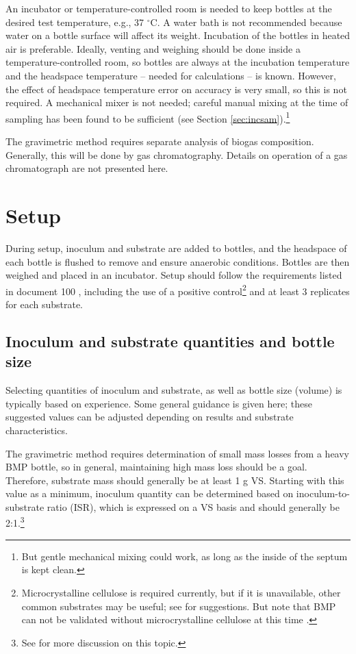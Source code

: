 \documentclass[]{article}
\begin{document}
An incubator or temperature-controlled room is needed to keep bottles at the desired test temperature, e.g., 37 $^\circ$C.
A water bath is not recommended because water on a bottle surface will affect its weight.
Incubation of the bottles in heated air is preferable.
Ideally, venting and weighing should be done inside a temperature-controlled room, so bottles are always at the incubation temperature and the headspace temperature -- needed for calculations -- is known.
However, the effect of headspace temperature error on accuracy is very small, so this is not required.
A mechanical mixer is not needed; careful manual mixing at the time of sampling has been found to be sufficient (see Section \ref{sec:incsam}).\footnote{But gentle mechanical mixing could work, as long as the inside of the septum is kept clean.}

The gravimetric method requires separate analysis of biogas composition.
Generally, this will be done by gas chromatography.
Details on operation of a gas chromatograph are not presented here.

\section{Setup}
\label{sec:setup}
During setup, inoculum and substrate are added to bottles, and the headspace of each bottle is flushed to remove  and ensure anaerobic conditions. 
Bottles are then weighed and placed in an incubator.
Setup should follow the requirements listed in document 100 \citep{BMPdoc100req}, including the use of a positive control\footnote{Microcrystalline cellulose is required currently, but if it is unavailable, other common substrates may be useful; see \citet{kochEvaluationCommonSupermarket2020} for suggestions. But note that BMP can not be validated without microcrystalline cellulose at this time \citep{BMPdoc100req}.}
and at least 3 replicates for each substrate.

\subsection{Inoculum and substrate quantities and bottle size}
\label{sec:quantities}
Selecting quantities of inoculum and substrate, as well as bottle size (volume) is typically based on experience.
Some general guidance is given here; these suggested values can be adjusted depending on results and substrate characteristics.

The gravimetric method requires determination of small mass losses from a heavy BMP bottle, so in general, maintaining high mass loss should be a goal.
Therefore, substrate mass should generally be at least 1 g VS.
Starting with this value as a minimum, inoculum quantity can be determined based on inoculum-to-substrate ratio (ISR), which is expressed on a VS basis and should generally be 2:1.\footnote{See \citet{holligerStandardizationBiomethanePotential2016} for more discussion on this topic.}
\end{document}
